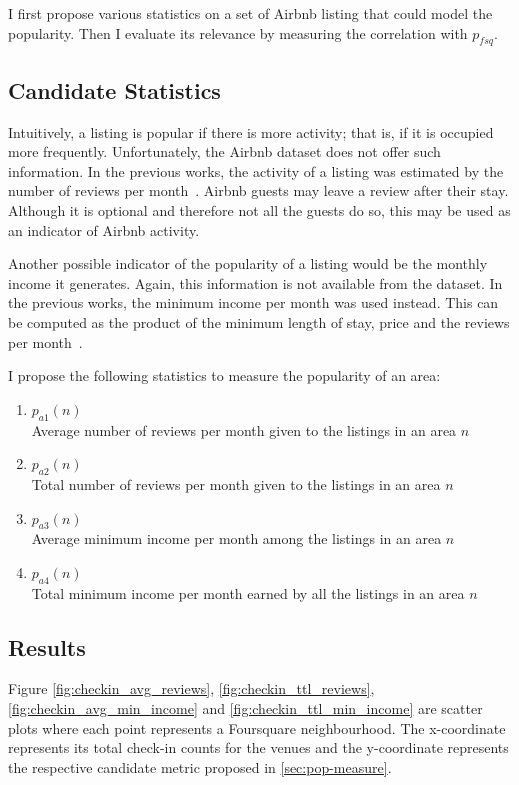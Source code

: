 I first propose various statistics on a set of Airbnb listing that could model the popularity. Then I evaluate its relevance by measuring the correlation with $p_{fsq}$.
\subsection{Candidate Statistics}
Intuitively, a listing is popular if there is more activity; that is, if it is occupied more frequently. Unfortunately, the Airbnb dataset does not offer such information. In the previous works, the activity of a listing was estimated by the number of reviews per month~\citep{cansoy2016gets, insideairbnb}. Airbnb guests may leave a review after their stay. Although it is optional and therefore not all the guests do so, this may be used as an indicator of Airbnb activity. 

Another possible indicator of the popularity of a listing would be the monthly income it generates. Again, this information is not available from the dataset. In the previous works, the minimum income per month was used instead. This can be computed as the product of the minimum length of stay, price and the reviews per month~\citep{cansoy2016gets, insideairbnb}. 

I propose the following statistics to measure the popularity of an area:
\begin{enumerate}
\item $p_{a1}(n)$\\ Average number of reviews per month given to the listings in an area $n$
\item $p_{a2}(n)$\\ Total number of reviews per month given to the listings in an area $n$
\item $p_{a3}(n)$\\ Average minimum income per month among the listings in an area $n$
\item $p_{a4}(n)$\\ Total minimum income per month earned by all the listings in an area $n$
\end{enumerate}
\label{sec:pop-measure}
\subsection{Results}
Figure \ref{fig:checkin_avg_reviews}, \ref{fig:checkin_ttl_reviews}, \ref{fig:checkin_avg_min_income} and \ref{fig:checkin_ttl_min_income} are scatter plots where each point represents a Foursquare neighbourhood. The x-coordinate represents its total check-in counts for the venues and the y-coordinate represents the respective candidate metric proposed in \ref{sec:pop-measure}.

